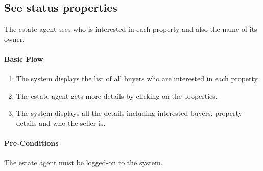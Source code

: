 \documentclass[a4paper,12pt]{article}
\begin{document}
\subsection{See status properties}
The estate agent sees who is interested in each property and also the name of its owner.
\paragraph{Basic Flow}
\begin{enumerate}
\item The system displays the list of all buyers who are interested in each property.
\item The estate agent gets more details by clicking on the properties.
\item The system displays all the details including interested buyers, property details and who the seller is.
\end{enumerate}
\paragraph{Pre-Conditions}
The estate agent must be logged-on to the system.
\end{document}
